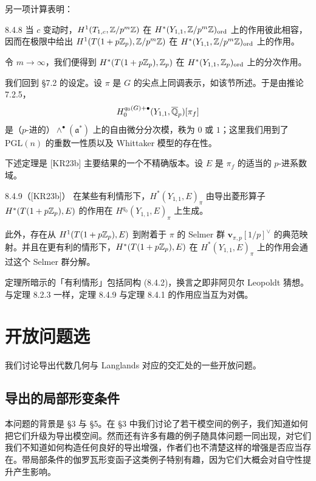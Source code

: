 另一项计算表明：

\begin{prop}{8.4.8}\label{thm:a6-06-8}
当 $c$ 变动时，$H^1(T_{1,c},\mathbb{Z}/p^m\mathbb{Z})$ 在 $H^*(Y_{1,1},\mathbb{Z}/p^m\mathbb{Z})_{\mathrm{ord}}$ 上的作用彼此相容，因而在极限中给出 $H^1(T(1+p\mathbb{Z}_p),\mathbb{Z}/p^m\mathbb{Z})$ 在 $H^*(Y_{1,1},\mathbb{Z}/p^m\mathbb{Z})_{\mathrm{ord}}$ 上的作用。

令 $m\to\infty$，我们便得到 $H^*(T(1+p\mathbb{Z}_p),\mathbb{Z}_p)$ 在 $H^*(Y_{1,1},\mathbb{Z}_p)_{\mathrm{ord}}$ 上的分次作用。
\end{prop}

我们回到 §7.2 的设定。设 $\pi$ 是 $G$ 的尖点上同调表示，如该节所述。于是由推论 7.2.5，
\[
H^{q_0(G)+\bullet}_0(Y_{1,1},\overline{\mathbb{Q}}_p)[\pi_f]
\]
是（$p$-进的）$\wedge^\bullet(\mathfrak a^*)$ 上的自由微分分次模，秩为 $0$ 或 $1$；这里我们用到了 $\mathrm{PGL}(n)$ 的重数一性质以及 Whittaker 模型的存在性。

下述定理是 [KR23b] 主要结果的一个不精确版本。设 $E$ 是 $\pi_f$ 的适当的 $p$-进系数域。

\begin{thm}{8.4.9}（[KR23b]）\label{thm:a6-06-9}
在某些有利情形下，$H^*(Y_{1,1},E)_\pi$ 由导出菱形算子 $H^*(T(1+p\mathbb{Z}_p),E)$ 的作用在 $H^{q_0}(Y_{1,1},E)_\pi$ 上生成。

此外，存在从 $H^1(T(1+p\mathbb{Z}_p),E)$ 到附着于 $\pi$ 的 Selmer 群 $\mathbf v_{\pi,p}[1/p]^\vee$ 的典范映射。并且在更有利的情形下，$H^*(T(1+p\mathbb{Z}_p),E)$ 在 $H^*(Y_{1,1},E)_\pi$ 上的作用会通过这个 Selmer 群分解。
\end{thm}

定理所暗示的「有利情形」包括同构 (8.4.2)，换言之即非阿贝尔 Leopoldt 猜想。与定理 8.2.3 一样，定理 8.4.9 与定理 8.4.1 的作用应当互为对偶。

\section{开放问题选}

我们讨论导出代数几何与 Langlands 对应的交汇处的一些开放问题。

\subsection{导出的局部形变条件}

本问题的背景是 §3 与 §5。在 §3 中我们讨论了若干模空间的例子，我们知道如何把它们升级为导出模空间。然而还有许多有趣的例子随具体问题一同出现，对它们我们不知道如何构造任何良好的导出增强，作者们也不清楚这样的增强是否应当存在。带局部条件的伽罗瓦形变函子这类例子特别有趣，因为它们大概会对自守性提升产生影响。

